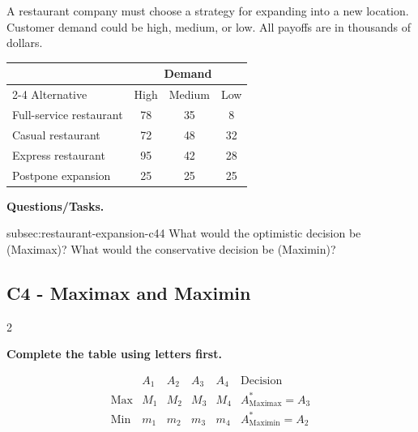 	{
		A restaurant company must choose a strategy for expanding into a new
		location. Customer demand could be high, medium, or low. All payoffs are in
		thousands of dollars.
		
		\begin{center}
			\renewcommand{\arraystretch}{1.3}
			\small
			\begin{tabular}{lccc}
				\toprule
				& \multicolumn{3}{c}{Demand} \\
				\cmidrule(lr){2-4}
				Alternative & High & Medium & Low \\
				\midrule
				Full-service restaurant & 78 & 35 & 8 \\
				Casual restaurant & 72 & 48 & 32 \\
				Express restaurant & 95 & 42 & 28 \\
				Postpone expansion & 25 & 25 & 25 \\
				\bottomrule
			\end{tabular}
		\end{center}
		\vspace{-5mm}
		
		\textbf{Questions/Tasks.}
		\begin{enumerate}
			\CriterionTask
			{subsec:restaurant-expansion-c4}{4}
			{What would the optimistic decision be (Maximax)? What would the conservative decision be (Maximin)? }
		\end{enumerate}
		
		\label{subsec:restaurant-expansion-c4}
		\subsection*{C4 - Maximax and Maximin }
		
		
		\begin{multicols}{2}
			
			\textbf{Complete the table using letters first.}
			
			\[
			\begin{array}{c|ccccc}
				& A_1 & A_2 & A_3 & A_4 & \text{Decision}\\
				\hline
				\text{Max} &
				M_1 & M_2 & M_3 & M_4 &
				A^*_{\mathrm{Maximax}}=A_3
				\\
				\text{Min} &
				m_1 & m_2 & m_3 & m_4 &
				A^*_{\mathrm{Maximin}}=A_2
			\end{array}
			\]
			

\end{multicols}}
